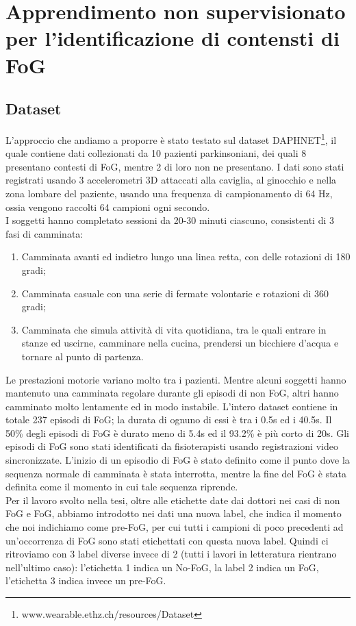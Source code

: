 

\chapter[Apprendimento non supervisionato]{Apprendimento non supervisionato per l'identificazione di contensti di FoG}\label{chap5:Automatic}
\section{Dataset}
L'approccio che andiamo a proporre è stato testato sul dataset DAPHNET\footnote{www.wearable.ethz.ch/resources/Dataset}, il quale contiene dati collezionati da 10 pazienti parkinsoniani, dei quali 8 presentano contesti di FoG, mentre 2 di loro non ne presentano. I dati sono stati registrati usando 3 accelerometri 3D attaccati alla caviglia, al ginocchio e nella zona lombare del paziente, usando una frequenza di campionamento di 64 Hz, ossia vengono raccolti 64 campioni ogni secondo.\\
I soggetti hanno completato sessioni da 20-30 minuti ciascuno, consistenti di 3 fasi di camminata:
\begin{enumerate}
	\item Camminata avanti ed indietro lungo una linea retta, con delle rotazioni di 180 gradi;
	\item Camminata casuale con una serie di fermate volontarie e rotazioni di 360 gradi;
	\item Camminata che simula attività di vita quotidiana, tra le quali entrare in stanze ed uscirne, camminare nella cucina, prendersi un bicchiere d'acqua e tornare al punto di partenza.
\end{enumerate}
Le prestazioni motorie variano molto tra i pazienti. Mentre alcuni soggetti hanno mantenuto una camminata regolare durante gli episodi di non FoG, altri hanno camminato molto lentamente ed in modo instabile. L'intero dataset contiene in totale 237 episodi di FoG; la durata di ognuno di essi è tra i 0.5s ed i 40.5s. Il 50\% degli episodi di FoG è durato meno di 5.4s ed il 93.2\% è più corto di 20s. Gli episodi di FoG sono stati identificati da fisioterapisti usando registrazioni video sincronizzate. L'inizio di un episodio di FoG è stato definito come il punto dove la sequenza normale di camminata è stata interrotta, mentre la fine del FoG è stata definita come il momento in cui tale sequenza riprende.\\
Per il lavoro svolto nella tesi, oltre alle etichette date dai dottori nei casi di non FoG e FoG, abbiamo introdotto nei dati una nuova label, che indica il momento che noi indichiamo come pre-FoG, per cui tutti i campioni di poco precedenti ad un'occorrenza di FoG sono stati etichettati con questa nuova label. Quindi ci ritroviamo con 3 label diverse invece di 2 (tutti i lavori in letteratura rientrano nell'ultimo caso): l'etichetta 1 indica un No-FoG, la label 2 indica un FoG, l'etichetta 3 indica invece un pre-FoG.
